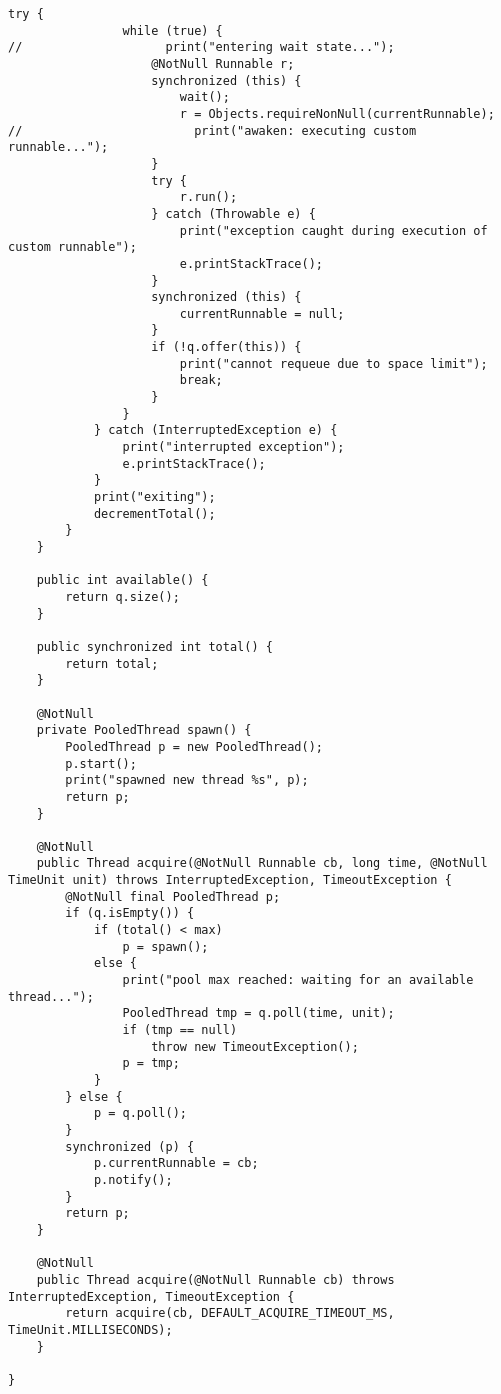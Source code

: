 \begin{lstlisting}[basicstyle=\small,]
            try {
                while (true) {
//                    print("entering wait state...");
                    @NotNull Runnable r;
                    synchronized (this) {
                        wait();
                        r = Objects.requireNonNull(currentRunnable);
//                        print("awaken: executing custom runnable...");
                    }
                    try {
                        r.run();
                    } catch (Throwable e) {
                        print("exception caught during execution of custom runnable");
                        e.printStackTrace();
                    }
                    synchronized (this) {
                        currentRunnable = null;
                    }
                    if (!q.offer(this)) {
                        print("cannot requeue due to space limit");
                        break;
                    }
                }
            } catch (InterruptedException e) {
                print("interrupted exception");
                e.printStackTrace();
            }
            print("exiting");
            decrementTotal();
        }
    }

    public int available() {
        return q.size();
    }

    public synchronized int total() {
        return total;
    }

    @NotNull
    private PooledThread spawn() {
        PooledThread p = new PooledThread();
        p.start();
        print("spawned new thread %s", p);
        return p;
    }

    @NotNull
    public Thread acquire(@NotNull Runnable cb, long time, @NotNull TimeUnit unit) throws InterruptedException, TimeoutException {
        @NotNull final PooledThread p;
        if (q.isEmpty()) {
            if (total() < max)
                p = spawn();
            else {
                print("pool max reached: waiting for an available thread...");
                PooledThread tmp = q.poll(time, unit);
                if (tmp == null)
                    throw new TimeoutException();
                p = tmp;
            }
        } else {
            p = q.poll();
        }
        synchronized (p) {
            p.currentRunnable = cb;
            p.notify();
        }
        return p;
    }

    @NotNull
    public Thread acquire(@NotNull Runnable cb) throws InterruptedException, TimeoutException {
        return acquire(cb, DEFAULT_ACQUIRE_TIMEOUT_MS, TimeUnit.MILLISECONDS);
    }

}


\end{lstlisting}
 
